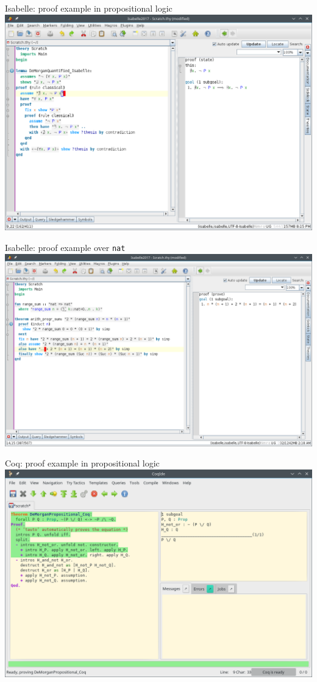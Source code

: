 \documentclass[aspectratio=169, 12pt, fleqn]{beamer}
\begin{document}
\begin{frame}
{Isabelle: proof example in propositional logic}
\includegraphics[scale=0.39]{img/isabelle_morgan.png}
\end{frame}

\begin{frame}{Isabelle: proof example over \texttt{nat}}
\includegraphics[scale=0.39]{img/isabelle_arith.png}
\end{frame}



\begin{frame}
{Coq: proof example in propositional logic}
\includegraphics[scale=0.42]{img/coq_morgan.png}
\end{frame}
\end{document}
